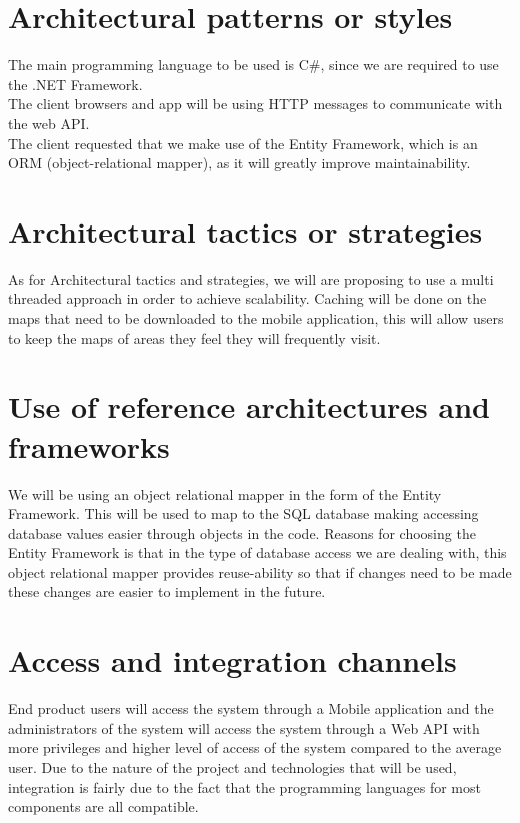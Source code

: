 \documentclass[11pt,titlepage]{article} %
\begin{document}
\section{Architectural patterns or styles}
The main programming language to be used is C\#, since we are required to use the .NET Framework.\\
The client browsers and app will be using HTTP messages to communicate with the web API.\\
The client requested that we make use of the Entity Framework, which is an ORM (object-relational mapper), as it will greatly improve maintainability.

\section{Architectural tactics or strategies}
As for Architectural tactics and strategies, we will are proposing to use a multi threaded approach in order to achieve scalability. Caching will be done on the maps that need to be downloaded to the mobile application, this will allow users to keep the maps of areas they feel they will frequently visit. 

\section{Use of reference architectures and frameworks}
We will be using an object relational mapper in the form of the Entity Framework. This will be used to map to the SQL database making accessing database values easier through objects in the code. Reasons for choosing the Entity Framework is that in the type of database access we are dealing with, this object relational mapper provides reuse-ability so that if changes need to be made these changes are easier to implement in the future. 

\section{Access and integration channels}
End product users will access the system through a Mobile application and the administrators of the system will access the system through a Web API with more privileges and higher level of access of the system compared to the average user. Due to the nature of the project and technologies that will be used, integration is fairly due to the fact that the programming languages for most components are all compatible.
\end{document}
